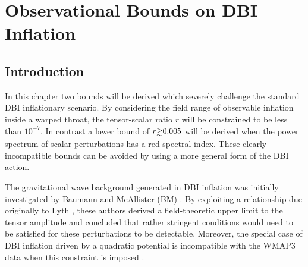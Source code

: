 \renewcommand{\CVSrevision}{\version$Id: dbi.tex,v 1.40 2009/09/22 10:46:26 ith Exp $}

\chapter{Observational Bounds on DBI Inflation}
\label{ch:dbi}
% 
% 
% 
\section{Introduction}
\label{sec:intro-dbi}

In this chapter two bounds will be derived which severely challenge the standard
DBI inflationary scenario. By considering the field range of observable
inflation inside a warped throat, the tensor-scalar ratio $r$ will be
constrained to be less than $10^{-7}$. In contrast a lower bound of $r\gsim
0.005$ will be derived when the power spectrum of scalar perturbations has a red
spectral index. These clearly incompatible bounds can be avoided by using a more
general form of the DBI action.

% 
The gravitational wave background generated in DBI 
inflation was initially investigated by Baumann and McAllister (BM) 
\cite{bmpaper}. By exploiting a relationship due originally 
to Lyth \cite{lyth}, these authors derived a field-theoretic upper limit 
to the tensor amplitude and concluded that 
rather stringent conditions would need to be satisfied for these 
perturbations to be detectable.      
Moreover, the special case of 
DBI inflation driven by a quadratic potential is incompatible with the WMAP3 
data when this constraint is imposed \cite{bean}.  


